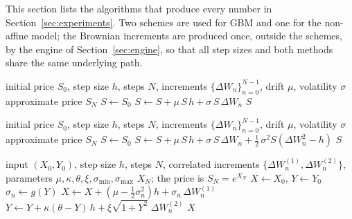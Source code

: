 \documentclass[11pt,a4paper]{article}
\theoremstyle{definition}
\theoremstyle{remark}
\begin{document}
This section lists the algorithms that produce every number in
Section~\ref{sec:experiments}. Two schemes are used for GBM and one for the
non-affine model; the Brownian increments are produced once, outside the
schemes, by the engine of Section~\ref{sec:engine}, so that all step sizes and
both methods share the same underlying path.

\begin{algorithm}[H]
\caption{Euler--Maruyama (EM) for GBM, $dS = \mu S\,dt + \sigma S\,dW$}
\label{alg:em}
\begin{algorithmic}[1]
\Require initial price $S_0$, step size $h$, steps $N$,
         increments $\{\Delta W_n\}_{n=0}^{N-1}$, drift $\mu$, volatility $\sigma$
\Ensure approximate price $S_N$
\State $S \leftarrow S_0$
    \State $S \leftarrow S + \mu\, S\, h + \sigma\, S\, \Delta W_n$
\EndFor
\State \Return $S$
\end{algorithmic}
\end{algorithm}

\begin{algorithm}[H]
\caption{Milstein for GBM, $dS = \mu S\,dt + \sigma S\,dW$}
\label{alg:milstein}
\begin{algorithmic}[1]
\Require initial price $S_0$, step size $h$, steps $N$,
         increments $\{\Delta W_n\}_{n=0}^{N-1}$, drift $\mu$, volatility $\sigma$
\Ensure approximate price $S_N$
\State $S \leftarrow S_0$
    \State $S \leftarrow S + \mu\, S\, h + \sigma\, S\, \Delta W_n
                    + \tfrac12\, \sigma^2 S \left( \Delta W_n^2 - h \right)$
\EndFor
\State \Return $S$
\end{algorithmic}
\end{algorithm}

\begin{algorithm}[H]
\caption{Euler--Maruyama for the non-affine model, state $z_n = (X_n, Y_n)$}
\label{alg:em-nasv}
\begin{algorithmic}[1]
\Require input $(X_0, Y_0)$, step size $h$, steps $N$,
         correlated increments $\{\Delta W_n^{(1)}, \Delta W_n^{(2)}\}$,
         parameters $\mu, \kappa, \theta, \xi, \sigma_{\min}, \sigma_{\max}$
\Ensure $X_N$; the price is $S_N = e^{X_N}$
\State $X \leftarrow X_0$, \; $Y \leftarrow Y_0$
    \State $\sigma_n \leftarrow g(Y)$
    \State $X \leftarrow X + \left( \mu - \tfrac12 \sigma_n^2 \right) h
              + \sigma_n\, \Delta W_n^{(1)}$
    \State $Y \leftarrow Y + \kappa (\theta - Y)\, h
              + \xi \sqrt{1 + Y^2}\; \Delta W_n^{(2)}$
\EndFor
\State \Return $X$
\end{algorithmic}
\end{algorithm}
\end{document}
